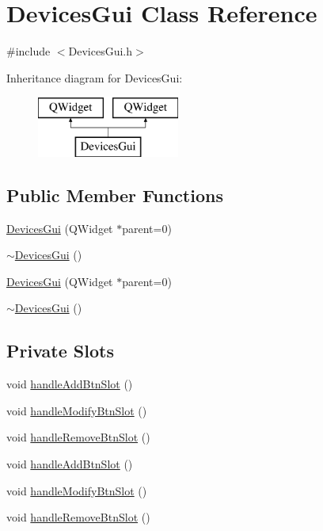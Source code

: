 \hypertarget{class_devices_gui}{\section{Devices\-Gui Class Reference}
\label{class_devices_gui}
}


{\ttfamily \#include $<$Devices\-Gui.\-h$>$}

Inheritance diagram for Devices\-Gui\-:\begin{figure}[H]
\begin{center}
\leavevmode
\includegraphics[height=2.000000cm]{class_devices_gui}
\end{center}
\end{figure}
\subsection*{Public Member Functions}
\begin{DoxyCompactItemize}
\item 
\hyperlink{class_devices_gui_a81ae9e27dd22317cb86ff7ed426146aa}{Devices\-Gui} (Q\-Widget $\ast$parent=0)
\item 
\hyperlink{class_devices_gui_a77c60b51e5b9cd383db8ecd212e13c63}{$\sim$\-Devices\-Gui} ()
\item 
\hyperlink{class_devices_gui_a81ae9e27dd22317cb86ff7ed426146aa}{Devices\-Gui} (Q\-Widget $\ast$parent=0)
\item 
\hyperlink{class_devices_gui_a77c60b51e5b9cd383db8ecd212e13c63}{$\sim$\-Devices\-Gui} ()
\end{DoxyCompactItemize}
\subsection*{Private Slots}
\begin{DoxyCompactItemize}
\item 
void \hyperlink{class_devices_gui_a5fb44951ea327c82fb4b193311fc5139}{handle\-Add\-Btn\-Slot} ()
\item 
void \hyperlink{class_devices_gui_ae2e456c50683f59d52893b7296b2210e}{handle\-Modify\-Btn\-Slot} ()
\item 
void \hyperlink{class_devices_gui_a9e43d3738032e5f80ae84cfcb2eb4d18}{handle\-Remove\-Btn\-Slot} ()
\item 
void \hyperlink{class_devices_gui_a5fb44951ea327c82fb4b193311fc5139}{handle\-Add\-Btn\-Slot} ()
\item 
void \hyperlink{class_devices_gui_ae2e456c50683f59d52893b7296b2210e}{handle\-Modify\-Btn\-Slot} ()
\item 
void \hyperlink{class_devices_gui_a9e43d3738032e5f80ae84cfcb2eb4d18}{handle\-Remove\-Btn\-Slot} ()
\end{DoxyCompactItemize}

